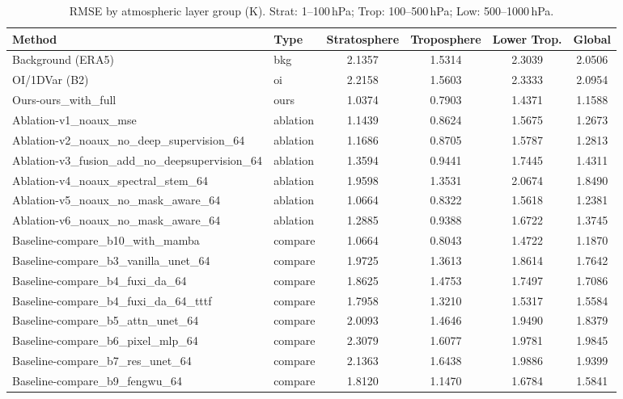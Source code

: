 \begin{table}[htbp]
\centering
\caption{RMSE by atmospheric layer group (K). Strat: 1--100\,hPa; Trop: 100--500\,hPa; Low: 500--1000\,hPa.}
\begin{tabular}{llcccc}
\toprule
Method & Type & Stratosphere & Troposphere & Lower Trop. & Global \\
\midrule
Background (ERA5) & bkg & 2.1357 & 1.5314 & 2.3039 & 2.0506 \\
OI/1DVar (B2) & oi & 2.2158 & 1.5603 & 2.3333 & 2.0954 \\
Ours-ours\_with\_full & ours & 1.0374 & 0.7903 & 1.4371 & 1.1588 \\
Ablation-v1\_noaux\_mse & ablation & 1.1439 & 0.8624 & 1.5675 & 1.2673 \\
Ablation-v2\_noaux\_no\_deep\_supervision\_64 & ablation & 1.1686 & 0.8705 & 1.5787 & 1.2813 \\
Ablation-v3\_fusion\_add\_no\_deepsupervision\_64 & ablation & 1.3594 & 0.9441 & 1.7445 & 1.4311 \\
Ablation-v4\_noaux\_spectral\_stem\_64 & ablation & 1.9598 & 1.3531 & 2.0674 & 1.8490 \\
Ablation-v5\_noaux\_no\_mask\_aware\_64 & ablation & 1.0664 & 0.8322 & 1.5618 & 1.2381 \\
Ablation-v6\_noaux\_no\_mask\_aware\_64 & ablation & 1.2885 & 0.9388 & 1.6722 & 1.3745 \\
Baseline-compare\_b10\_with\_mamba & compare & 1.0664 & 0.8043 & 1.4722 & 1.1870 \\
Baseline-compare\_b3\_vanilla\_unet\_64 & compare & 1.9725 & 1.3613 & 1.8614 & 1.7642 \\
Baseline-compare\_b4\_fuxi\_da\_64 & compare & 1.8625 & 1.4753 & 1.7497 & 1.7086 \\
Baseline-compare\_b4\_fuxi\_da\_64\_tttf & compare & 1.7958 & 1.3210 & 1.5317 & 1.5584 \\
Baseline-compare\_b5\_attn\_unet\_64 & compare & 2.0093 & 1.4646 & 1.9490 & 1.8379 \\
Baseline-compare\_b6\_pixel\_mlp\_64 & compare & 2.3079 & 1.6077 & 1.9781 & 1.9845 \\
Baseline-compare\_b7\_res\_unet\_64 & compare & 2.1363 & 1.6438 & 1.9886 & 1.9399 \\
Baseline-compare\_b9\_fengwu\_64 & compare & 1.8120 & 1.1470 & 1.6784 & 1.5841 \\
\bottomrule
\end{tabular}
\end{table}
